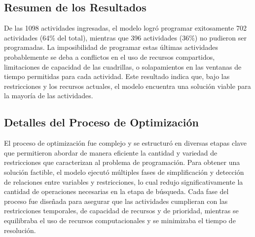 \documentclass{article}
\begin{document}
\subsection{Resumen de los Resultados}

De las 1098 actividades ingresadas, el modelo logró programar exitosamente 702 actividades (64\% del total), mientras que 396 actividades (36\%) no pudieron ser programadas. La imposibilidad de programar estas últimas actividades probablemente se deba a conflictos en el uso de recursos compartidos, limitaciones de capacidad de las cuadrillas, o solapamientos en las ventanas de tiempo permitidas para cada actividad. Este resultado indica que, bajo las restricciones y los recursos actuales, el modelo encuentra una solución viable para la mayoría de las actividades.

\subsection{Detalles del Proceso de Optimización}

El proceso de optimización fue complejo y se estructuró en diversas etapas clave que permitieron abordar de manera eficiente la cantidad y variedad de restricciones que caracterizan al problema de programación. Para obtener una solución factible, el modelo ejecutó múltiples fases de simplificación y detección de relaciones entre variables y restricciones, lo cual redujo significativamente la cantidad de operaciones necesarias en la etapa de búsqueda. Cada fase del proceso fue diseñada para asegurar que las actividades cumplieran con las restricciones temporales, de capacidad de recursos y de prioridad, mientras se equilibraba el uso de recursos computacionales y se minimizaba el tiempo de resolución.
\end{document}

